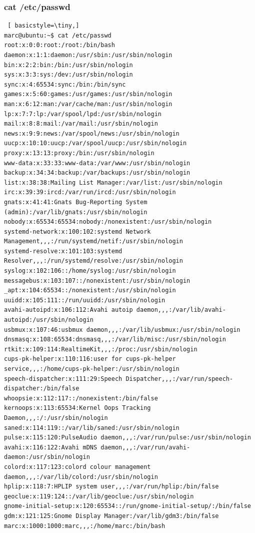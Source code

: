 \documentclass[preprint,11pt]{elsarticle}
\begin{document}
\subsubsection{cat /etc/passwd}
\begin{lstlisting} [ basicstyle=\tiny,]
marc@ubuntu:~$ cat /etc/passwd
root:x:0:0:root:/root:/bin/bash
daemon:x:1:1:daemon:/usr/sbin:/usr/sbin/nologin
bin:x:2:2:bin:/bin:/usr/sbin/nologin
sys:x:3:3:sys:/dev:/usr/sbin/nologin
sync:x:4:65534:sync:/bin:/bin/sync
games:x:5:60:games:/usr/games:/usr/sbin/nologin
man:x:6:12:man:/var/cache/man:/usr/sbin/nologin
lp:x:7:7:lp:/var/spool/lpd:/usr/sbin/nologin
mail:x:8:8:mail:/var/mail:/usr/sbin/nologin
news:x:9:9:news:/var/spool/news:/usr/sbin/nologin
uucp:x:10:10:uucp:/var/spool/uucp:/usr/sbin/nologin
proxy:x:13:13:proxy:/bin:/usr/sbin/nologin
www-data:x:33:33:www-data:/var/www:/usr/sbin/nologin
backup:x:34:34:backup:/var/backups:/usr/sbin/nologin
list:x:38:38:Mailing List Manager:/var/list:/usr/sbin/nologin
irc:x:39:39:ircd:/var/run/ircd:/usr/sbin/nologin
gnats:x:41:41:Gnats Bug-Reporting System (admin):/var/lib/gnats:/usr/sbin/nologin
nobody:x:65534:65534:nobody:/nonexistent:/usr/sbin/nologin
systemd-network:x:100:102:systemd Network Management,,,:/run/systemd/netif:/usr/sbin/nologin
systemd-resolve:x:101:103:systemd Resolver,,,:/run/systemd/resolve:/usr/sbin/nologin
syslog:x:102:106::/home/syslog:/usr/sbin/nologin
messagebus:x:103:107::/nonexistent:/usr/sbin/nologin
_apt:x:104:65534::/nonexistent:/usr/sbin/nologin
uuidd:x:105:111::/run/uuidd:/usr/sbin/nologin
avahi-autoipd:x:106:112:Avahi autoip daemon,,,:/var/lib/avahi-autoipd:/usr/sbin/nologin
usbmux:x:107:46:usbmux daemon,,,:/var/lib/usbmux:/usr/sbin/nologin
dnsmasq:x:108:65534:dnsmasq,,,:/var/lib/misc:/usr/sbin/nologin
rtkit:x:109:114:RealtimeKit,,,:/proc:/usr/sbin/nologin
cups-pk-helper:x:110:116:user for cups-pk-helper service,,,:/home/cups-pk-helper:/usr/sbin/nologin
speech-dispatcher:x:111:29:Speech Dispatcher,,,:/var/run/speech-dispatcher:/bin/false
whoopsie:x:112:117::/nonexistent:/bin/false
kernoops:x:113:65534:Kernel Oops Tracking Daemon,,,:/:/usr/sbin/nologin
saned:x:114:119::/var/lib/saned:/usr/sbin/nologin
pulse:x:115:120:PulseAudio daemon,,,:/var/run/pulse:/usr/sbin/nologin
avahi:x:116:122:Avahi mDNS daemon,,,:/var/run/avahi-daemon:/usr/sbin/nologin
colord:x:117:123:colord colour management daemon,,,:/var/lib/colord:/usr/sbin/nologin
hplip:x:118:7:HPLIP system user,,,:/var/run/hplip:/bin/false
geoclue:x:119:124::/var/lib/geoclue:/usr/sbin/nologin
gnome-initial-setup:x:120:65534::/run/gnome-initial-setup/:/bin/false
gdm:x:121:125:Gnome Display Manager:/var/lib/gdm3:/bin/false
marc:x:1000:1000:marc,,,:/home/marc:/bin/bash

        \end{lstlisting}
\end{document}

